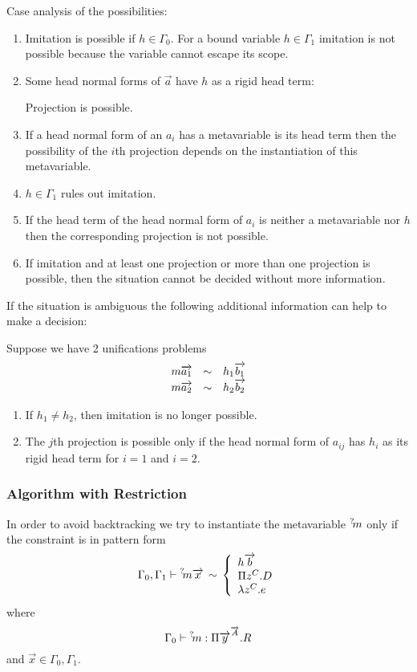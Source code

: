 Case analysis of the possibilities:
\begin{enumerate}

    \item Imitation is possible if $h \in \Gamma_0$. For a bound variable $h \in
        \Gamma_1$ imitation is not possible because the variable cannot escape
        its scope.

    \item Some head normal forms of $\vec a$ have $h$ as a rigid head term:

        Projection is possible.

    \item If a head normal form of an $a_i$ has a metavariable is its head term
        then the possibility of the $i$th projection depends on the
        instantiation of this metavariable.

    \item $h \in \Gamma_1$ rules out imitation.

    \item If the head term of the head normal form of $a_i$ is neither a
        metavariable nor $h$ then the corresponding projection is not possible.

    \item If imitation and at least one projection or more than one projection
        is possible, then the situation cannot be decided without more
        information.
\end{enumerate}


If the situation is ambiguous the following additional information can help to
make a decision:

Suppose we have 2 unifications problems
$$
\begin{array}{lllll} 
    m {\overrightarrow {a_1}} &\sim& h_1 {\overrightarrow {b_1}}
    \\
    m {\overrightarrow {a_2}} &\sim& h_2 {\overrightarrow {b_2}}
 \end{array}
$$

\begin{enumerate}

    \item If $h_1 \ne h_2$, then imitation is no longer possible.

    \item The $j$th projection is possible only if the head normal form of
        $a_{ij}$ has $h_i$ as its rigid head term for $i=1$ and $i=2$.
\end{enumerate}








\subsubsection{Algorithm with Restriction}
In order to avoid backtracking we try to instantiate the metavariable ${{}^? \kern-0.2em m}$
only if the constraint is in pattern form
$$
    \Gamma_0, \Gamma_1
    \vdash
    {{}^? \kern-0.2em m} {\overrightarrow {x}}
    \,\sim\,
    \left\{ \begin{array}{lllll} 
        h {\overrightarrow {b}}
        \\
        \Pi z^C . D
        \\
        \lambda z^C . e
     \end{array} \right.
$$
where
$$
    \Gamma_0 \vdash {{}^? \kern-0.2em m} : \Pi {\overrightarrow {y}}^{{\overrightarrow {A}}}. R
$$
and
$\vec x \in \Gamma_0, \Gamma_1$.

